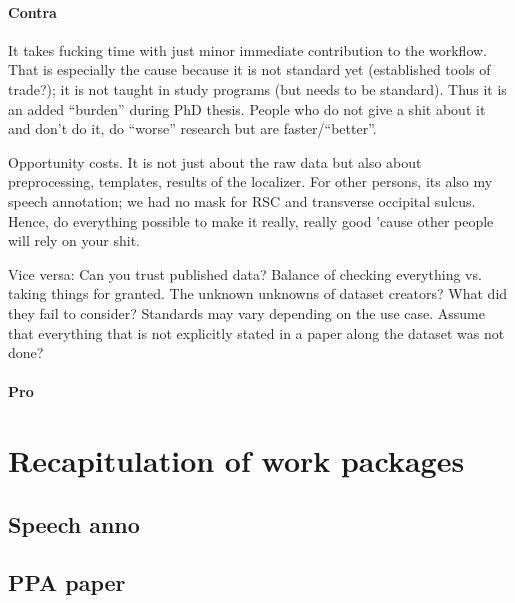 \paragraph{Contra}

%
It takes fucking time with just minor immediate contribution to the workflow.
%
That is especially the cause because it is not standard yet (established tools
of trade?); it is not taught in study programs (but needs to be standard).
Thus it is an added ``burden'' during PhD thesis.
%
People who do not give a shit about it and don't do it, do ``worse'' research
but are faster/``better''.

%
Opportunity costs. It is not just about the raw data but also about
preprocessing, templates, results of the localizer. For other persons, its also
my speech annotation; we had no mask for RSC and transverse occipital sulcus.
%
Hence, do everything possible to make it really, really good 'cause other people
will rely on your shit.

%
Vice versa: Can you trust published data? Balance of checking everything vs.
taking things for granted.
%
The unknown unknowns of dataset creators? What did they fail to consider?
Standards may vary depending on the use case. Assume that everything that is not
explicitly stated in a paper along the dataset was not done?


\paragraph{Pro}




\section{Recapitulation of work packages}



\subsection{Speech anno}



\subsection{PPA paper}

